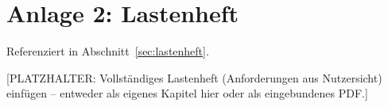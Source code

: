 \section*{Anlage 2: Lastenheft}
\label{anh:lastenheft}
Referenziert in Abschnitt~\ref{sec:lastenheft}.

[PLATZHALTER: Vollst\"andiges Lastenheft (Anforderungen aus Nutzersicht)
einf\"ugen -- entweder als eigenes Kapitel hier oder als eingebundenes PDF.]
